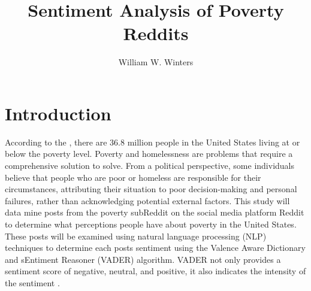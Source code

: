 \documentclass[stu,12pt,floatsintext]{apa7}
\title{Sentiment Analysis of Poverty Reddits}
\author{William W. Winters}
\begin{document}
\maketitle

\section{Introduction}
\indent According to the \citet{uscensus2025}, there are 36.8 million people in the United States living at or below the poverty level.  Poverty and homelessness are problems that require a comprehensive solution to solve.  From a political perspective, some individuals believe that people who are poor or homeless are responsible for their circumstances, attributing their situation to poor decision-making and personal failures, rather than acknowledging potential external factors.  This study will data mine posts from the poverty subReddit on the social media platform Reddit to determine what perceptions people have about poverty in the United States.  These posts will be examined using natural language processing (NLP) techniques to determine each posts sentiment using the  Valence Aware Dictionary and sEntiment Reasoner (VADER) algorithm.  VADER not only provides a sentiment score of negative, neutral, and positive, it also indicates the intensity of the sentiment \citep{nltk2024}.
\end{document}
